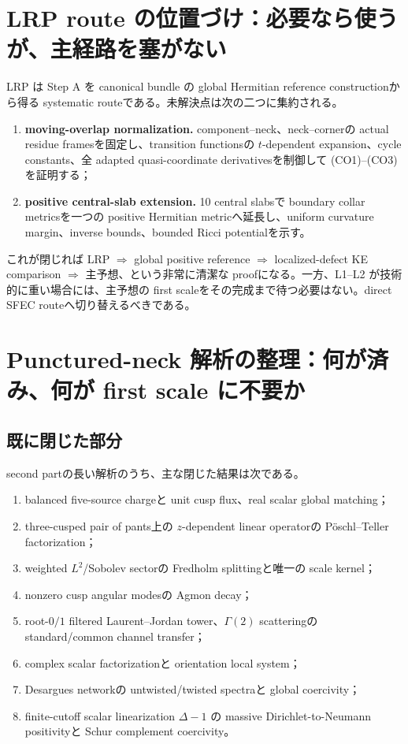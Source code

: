 \documentclass[11pt,a4paper]{ltjsarticle}
\theoremstyle{plain}
\theoremstyle{definition}
\theoremstyle{remark}
\begin{document}
\section{LRP route の位置づけ：必要なら使うが、主経路を塞がない}\label{sec:lrp-attack-v21}

LRP は Step A を canonical bundle の global Hermitian reference constructionから得る systematic routeである。未解決点は次の二つに集約される。

\begin{enumerate}[label=(L\arabic*)]
\item \textbf{moving-overlap normalization.} component--neck、neck--cornerの actual residue framesを固定し、transition functionsの $t$-dependent expansion、cycle constants、全 adapted quasi-coordinate derivativesを制御して (CO1)--(CO3) を証明する；
\item \textbf{positive central-slab extension.} 10 central slabsで boundary collar metricsを一つの positive Hermitian metricへ延長し、uniform curvature margin、inverse bounds、bounded Ricci potentialを示す。
\end{enumerate}

これが閉じれば LRP $\Rightarrow$ global positive reference $\Rightarrow$ localized-defect KE comparison $\Rightarrow$ 主予想、という非常に清潔な proofになる。一方、L1--L2 が技術的に重い場合には、主予想の first scaleをその完成まで待つ必要はない。direct SFEC routeへ切り替えるべきである。

\section{Punctured-neck 解析の整理：何が済み、何が first scale に不要か}\label{sec:pnp-status-v21}

\subsection{既に閉じた部分}
second partの長い解析のうち、主な閉じた結果は次である。
\begin{enumerate}
\item balanced five-source chargeと unit cusp flux、real scalar global matching；
\item three-cusped pair of pants上の $z$-dependent linear operatorの Pöschl--Teller factorization；
\item weighted $L^2$/Sobolev sectorの Fredholm splittingと唯一の scale kernel；
\item nonzero cusp angular modesの Agmon decay；
\item root-$0/1$ filtered Laurent--Jordan tower、$\Gamma(2)$ scatteringの standard/common channel transfer；
\item complex scalar factorizationと orientation local system；
\item Desargues networkの untwisted/twisted spectraと global coercivity；
\item finite-cutoff scalar linearization $\Delta-1$ の massive Dirichlet-to-Neumann positivityと Schur complement coercivity。
\end{enumerate}
\end{document}
